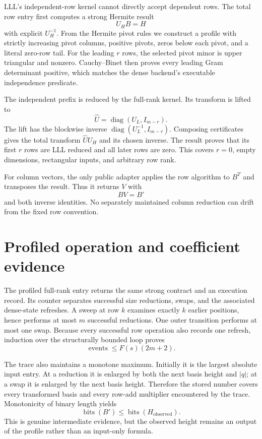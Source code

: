 \documentclass[11pt]{article}
\newcommand{\bits}{\operatorname{bits}}
\begin{document}
LLL's independent-row kernel cannot directly accept dependent rows.  The
total row entry first computes a strong Hermite result
\[
  U_HB=H
\]
with explicit $U_H^{-1}$.  From the Hermite pivot rules we construct a profile
with strictly increasing pivot columns, positive pivots, zeros below each
pivot, and a literal zero-row tail.  For the leading $r$ rows, the selected
pivot minor is upper triangular and nonzero.  Cauchy--Binet then proves every
leading Gram determinant positive, which matches the dense backend's
executable independence predicate.

The independent prefix is reduced by the full-rank kernel.  Its transform is
lifted to
\[
  \widehat U=\operatorname{diag}(U_L,I_{m-r}).
\]
The lift has the blockwise inverse
$\operatorname{diag}(U_L^{-1},I_{m-r})$.  Composing certificates gives the
total transform $\widehat U U_H$ and its chosen inverse.  The result proves
that its first $r$ rows are LLL reduced and all later rows are zero.  This
covers $r=0$, empty dimensions, rectangular inputs, and arbitrary row rank.

For column vectors, the only public adapter applies the row algorithm to
$B^T$ and transposes the result.  Thus it returns $V$ with
\[
  BV=B'
\]
and both inverse identities.  No separately maintained column reduction can
drift from the fixed row convention.

\section{Profiled operation and coefficient evidence}

The profiled full-rank entry returns the same strong contract and an execution
record.  Its counter separates successful size reductions, swaps, and the
associated dense-state refreshes.  A sweep at row $k$ examines exactly $k$
earlier positions, hence performs at most $m$ successful reductions.  One
outer transition performs at most one swap.  Because every successful row
operation also records one refresh, induction over the structurally bounded
loop proves
\[
  \operatorname{events}
  \le F(s)(2m+2).
\]

The trace also maintains a monotone maximum.  Initially it is the largest
absolute input entry.  At a reduction it is enlarged by both the next basis
height and $|q|$; at a swap it is enlarged by the next basis height.  Therefore
the stored number covers every transformed basis and every row-add multiplier
encountered by the trace.  Monotonicity of binary length yields
\[
  \bits(B')\le\bits(H_{\mathrm{observed}}).
\]
This is genuine intermediate evidence, but the observed height remains an
output of the profile rather than an input-only formula.
\end{document}
